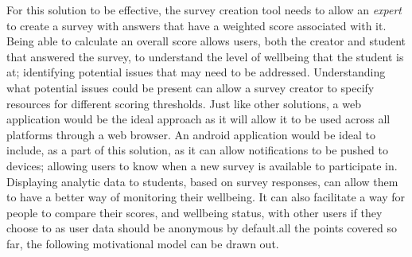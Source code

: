 For this solution to be effective, the survey creation tool needs to allow an \emph{expert} to create a survey with answers that have 
a weighted score associated with it. 
Being able to calculate an overall score allows users, both the creator and student that answered the survey, to understand the level of 
wellbeing that the student is at; identifying potential issues that may need to be addressed.
Understanding what potential issues could be present can allow a survey creator to specify resources for different scoring thresholds.
Just like other solutions, a web application would be the ideal approach as it will allow it to be used across all platforms through a web
browser.
An android application would be ideal to include, as a part of this solution, as it can allow notifications to be pushed to devices; allowing
users to know when a new survey is available to participate in.
Displaying analytic data to students, based on survey responses, can allow them to have a better way of monitoring their wellbeing.
It can also facilitate a way for people to compare their scores, and wellbeing status, with other users if they choose to as user data should be
anonymous by default.all the points covered so far, the following motivational model can be drawn out.
